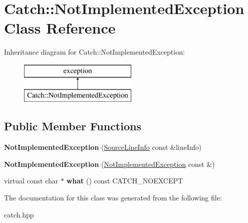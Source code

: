 \hypertarget{classCatch_1_1NotImplementedException}{}\section{Catch\+:\+:Not\+Implemented\+Exception Class Reference}
\label{classCatch_1_1NotImplementedException}
Inheritance diagram for Catch\+:\+:Not\+Implemented\+Exception\+:\begin{figure}[H]
\begin{center}
\leavevmode
\includegraphics[height=2.000000cm]{classCatch_1_1NotImplementedException}
\end{center}
\end{figure}
\subsection*{Public Member Functions}
\begin{DoxyCompactItemize}
\item 
{\bfseries Not\+Implemented\+Exception} (\hyperlink{structCatch_1_1SourceLineInfo}{Source\+Line\+Info} const \&line\+Info)\hypertarget{classCatch_1_1NotImplementedException_ab4f0a5c39d8ffb72c664e2c07e180634}{}\label{classCatch_1_1NotImplementedException_ab4f0a5c39d8ffb72c664e2c07e180634}

\item 
{\bfseries Not\+Implemented\+Exception} (\hyperlink{classCatch_1_1NotImplementedException}{Not\+Implemented\+Exception} const \&)\hypertarget{classCatch_1_1NotImplementedException_a508a7a833455da2d3c10ea1a9d45e982}{}\label{classCatch_1_1NotImplementedException_a508a7a833455da2d3c10ea1a9d45e982}

\item 
virtual const char $\ast$ {\bfseries what} () const C\+A\+T\+C\+H\+\_\+\+N\+O\+E\+X\+C\+E\+PT\hypertarget{classCatch_1_1NotImplementedException_ad4c13963f1a8feacda0cd331adda89e3}{}\label{classCatch_1_1NotImplementedException_ad4c13963f1a8feacda0cd331adda89e3}

\end{DoxyCompactItemize}


The documentation for this class was generated from the following file\+:\begin{DoxyCompactItemize}
\item 
catch.\+hpp\end{DoxyCompactItemize}
